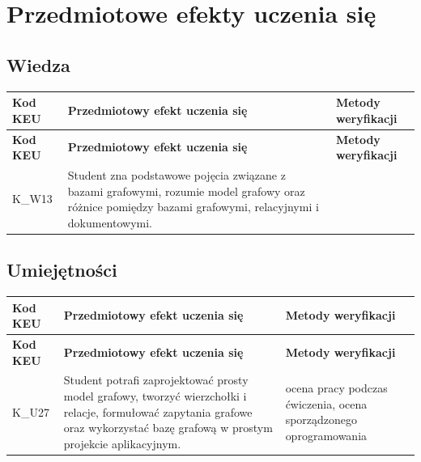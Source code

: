 \documentclass[12pt, a4paper]{article}
\newcommand{\thdrule}{\noalign{\global\setlength{\extrarowheight}{0pt}}}
\newcommand{\thdend}{\noalign{\global\setlength{\extrarowheight}{3pt}}}
\begin{document}
\section{Przedmiotowe efekty uczenia się}

\subsection*{Wiedza}
{\scriptsize
\begin{longtable}{m{1.6cm}m{9.0cm}m{4.2cm}}
\thdrule\toprule
\rowcolor{pjatkRed} {\color{white}\footnotesize\textbf{\vphantom{Ag}Kod KEU}} & {\color{white}\footnotesize\textbf{\vphantom{Ag}Przedmiotowy efekt uczenia się}} & {\color{white}\footnotesize\textbf{\vphantom{Ag}Metody weryfikacji}} \\
\midrule\thdend
\endfirsthead
\thdrule\toprule
\rowcolor{pjatkRed} {\color{white}\footnotesize\textbf{\vphantom{Ag}Kod KEU}} & {\color{white}\footnotesize\textbf{\vphantom{Ag}Przedmiotowy efekt uczenia się}} & {\color{white}\footnotesize\textbf{\vphantom{Ag}Metody weryfikacji}} \\
\midrule\thdend
\endhead
  \rowcolor{tableRowLight} K\_W13 & Student zna podstawowe pojęcia związane z bazami grafowymi, rozumie model grafowy oraz różnice pomiędzy bazami grafowymi, relacyjnymi i dokumentowymi. &  \\
\bottomrule
\end{longtable}}

\subsection*{Umiejętności}
{\scriptsize
\begin{longtable}{m{1.6cm}m{9.0cm}m{4.2cm}}
\thdrule\toprule
\rowcolor{pjatkRed} {\color{white}\footnotesize\textbf{\vphantom{Ag}Kod KEU}} & {\color{white}\footnotesize\textbf{\vphantom{Ag}Przedmiotowy efekt uczenia się}} & {\color{white}\footnotesize\textbf{\vphantom{Ag}Metody weryfikacji}} \\
\midrule\thdend
\endfirsthead
\thdrule\toprule
\rowcolor{pjatkRed} {\color{white}\footnotesize\textbf{\vphantom{Ag}Kod KEU}} & {\color{white}\footnotesize\textbf{\vphantom{Ag}Przedmiotowy efekt uczenia się}} & {\color{white}\footnotesize\textbf{\vphantom{Ag}Metody weryfikacji}} \\
\midrule\thdend
\endhead
  \rowcolor{tableRowLight} K\_U27 & Student potrafi zaprojektować prosty model grafowy, tworzyć wierzchołki i relacje, formułować zapytania grafowe oraz wykorzystać bazę grafową w prostym projekcie aplikacyjnym. & ocena pracy podczas ćwiczenia, ocena sporządzonego oprogramowania \\
\bottomrule
\end{longtable}}
\end{document}
